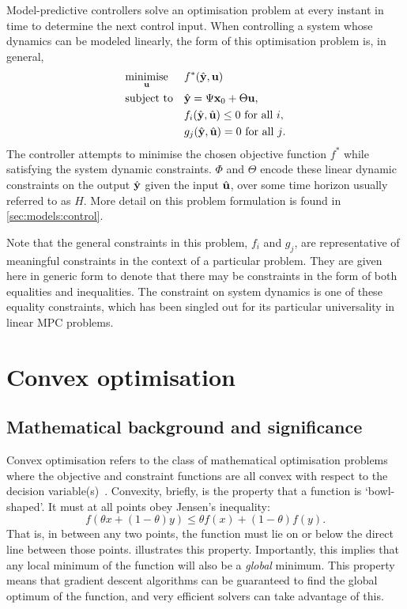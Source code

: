Model-predictive controllers solve an optimisation problem at every instant in time to determine the next control input.
When controlling a system whose dynamics can be modeled linearly, the form of this optimisation problem is, in general,
\begin{equation}
   \label{eq:mpc-opt}
   \begin{aligned}
      & \underset{\mathbf{u}}{\text{minimise}}
      & & f^*(\hat{\mathbf{y}}, \mathbf{u}) \\
      & \text{subject to}
      & & \hat{\mathbf{y}} = \Psi \mathbf{x}_0 + \Theta \mathbf{u}, \\
      &&& f_i(\hat{\mathbf{y}}, \hat{\mathbf{u}}) \le 0\ \text{for all $i$}, \\
      &&& g_j(\hat{\mathbf{y}}, \hat{\mathbf{u}})   = 0\ \text{for all $j$}. \\
   \end{aligned}
\end{equation}
The controller attempts to minimise the chosen objective function $f^*$ while satisfying the system dynamic constraints.
$\Phi$ and $\Theta$ encode these linear dynamic constraints on the output $\hat{\mathbf{y}}$ given the input $\hat{\mathbf{u}}$, over some time horizon usually referred to as $H$.
More detail on this problem formulation is found in \autoref{sec:models:control}.

Note that the general constraints in this problem, $f_i$ and $g_j$, are representative of meaningful constraints in the context of a particular problem.
They are given here in generic form to denote that there may be constraints in the form of both equalities and inequalities.
The constraint on system dynamics is one of these equality constraints, which has been singled out for its particular universality in linear MPC problems.

\section{Convex optimisation}
\label{sec:background:convex}

\subsection{Mathematical background and significance}

Convex optimisation refers to the class of mathematical optimisation problems where the objective and constraint functions are all convex with respect to the decision variable(s)~\cite{Boyd04}.
Convexity, briefly, is the property that a function is `bowl-shaped'.
It must at all points obey Jensen's inequality:
\begin{equation}
   \label{eq:jensen}
   f(\theta x + (1-\theta)y) \le \theta f(x) + (1-\theta) f(y).
\end{equation}
That is, in between any two points, the function must lie on or below the direct line between those points.
 illustrates this property.
Importantly, this implies that any local minimum of the function will also be a \emph{global} minimum.
This property means that gradient descent algorithms can be guaranteed to find the global optimum of the function, and very efficient solvers can take advantage of this.

